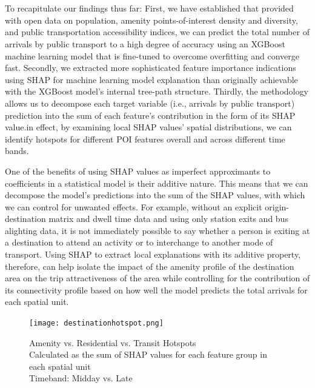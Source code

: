 \section*{}
To recapitulate our findings thus far: First, we have established that provided with open data on population, amenity points-of-interest density and diversity, and public transportation accessibility indices, we can predict the total number of arrivals by public transport to a high degree of accuracy using an XGBoost machine learning model that is fine-tuned to overcome overfitting and converge fast. Secondly, we extracted more sophisticated feature importance indications using SHAP for machine learning model explanation than originally achievable with the XGBoost model's internal tree-path structure. Thirdly, the methodology allows us to decompose each target variable (i.e., arrivals by public transport) prediction into the sum of each feature's contribution in the form of its SHAP value.in effect, by examining local SHAP values' spatial distributions, we can identify hotspots for different POI features overall and across different time bands.

One of the benefits of using SHAP values as imperfect approximants to coefficients in a statistical model is their additive nature. This means that we can decompose the model's predictions into the sum of the SHAP values, with which we can control for unwanted effects. For example, without an explicit origin-destination matrix and dwell time data and using only station exits and bus alighting data, it is not immediately possible to say whether a person is exiting at a destination to attend an activity or to interchange to another mode of transport. Using SHAP to extract local explanations with its additive property, therefore, can help isolate the impact of the amenity profile of the destination area on the trip attractiveness of the area while controlling for the contribution of its connectivity profile based on how well the model predicts the total arrivals for each spatial unit.

\begin{figure}[!htb]
    \centering
    \texttt{[image: destinationhotspot.png]}
    \captionsetup{justification=centering}
    \caption{Amenity vs. Residential vs. Transit Hotspots\\Calculated as the sum of SHAP values for each feature group in each spatial unit\\Timeband: Midday vs. Late}
    \label{fig:destinationhotspot}
\end{figure}

